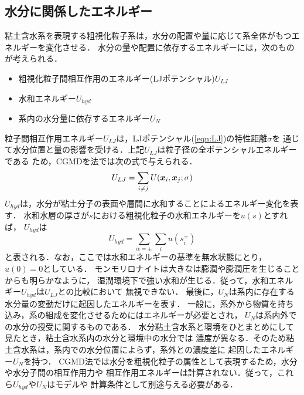 \subsection{水分に関係したエネルギー}
粘土含水系を表現する粗視化粒子系は，水分の配置や量に応じて系全体がもつエネルギーを変化させる．
水分の量や配置に依存するエネルギーには，次のものが考えられる．
\begin{itemize}
\item
	粗視化粒子間相互作用のエネルギー(LJポテンシャル)$U_{LJ}$
\item
	水和エネルギー$U_{hyd}$
\item
	系内の水分量に依存するエネルギー$U_N$
\end{itemize}
粒子間相互作用エネルギー$U_{LJ}$は，LJポテンシャル(\ref{eqn:LJ})の特性距離$\sigma$を
通じて水分位置と量の影響を受ける．上記$U_{LJ}$は粒子径の全ポテンシャルエネルギーである
ため，CGMDを法では次の式で与えられる．
\begin{equation}
	U_{LJ}=\sum_{i \neq j} U(\mbox{\boldmath $x$}_i,\mbox{\boldmath $x$}_j; \sigma) 
	\label{eqn:}
\end{equation}
$U_{hyd}$は，水分が粘土分子の表面や層間に水和することによるエネルギー変化を表す．
水和水層の厚さが$s$における粗視化粒子の水和エネルギーを$u(s)$とすれば，
$U_{hyd}$は
\begin{equation}
	U_{hyd} =\sum_{\alpha=\pm} \sum_{i} u(s_i^{\pm})
	\label{eqn:Uhyd_tot}
\end{equation}
と表される．なお，ここでは水和エネルギーの基準を無水状態にとり，$u(0)=0$としている．
モンモリロナイトは大きなは膨潤や膨潤圧を生じることからも明らかなように，
湿潤環境下で強い水和が生じる．従って，水和エネルギー$U_{hyd}$は$U_{LJ}$との比較において
無視できない．
最後に，$U_{N}$は系内に存在する水分量の変動だけに起因したエネルギーを表す．
一般に，系外から物質を持ち込み，系の組成を変化させるためにはエネルギーが必要とされ，
$U_N$は系内外での水分の授受に関するものである．
水分粘土含水系と環境をひとまとめにして見たとき，粘土含水系内の水分と環境中の水分では
濃度が異なる．そのため粘土含水系は，系内での水分位置によらず，系外との濃度差に
起因したエネルギー$U_N$を持つ．
CGMD法では水分を粗視化粒子の属性として表現するため，水分や水分子間の相互作用力や
相互作用エネルギーは計算されない．従って，これら$U_{hyd}$や$U_{N}$はモデルや
計算条件として別途与える必要がある．

